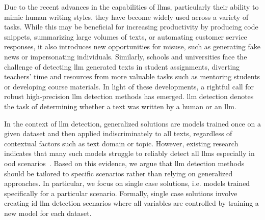 Due to the recent advances in the capabilities of \acp{llm}, particularly their ability to mimic human writing styles, they have become widely used across a variety of tasks.
While this may be beneficial for increasing productivity by producing code snippets, summarizing large volumes of texts, or automating customer service responses, it also introduces new opportunities for misuse, such as generating fake news or impersonating individuals.
Similarly, schools and universities face the challenge of detecting \ac{llm} generated texts in student assignments, diverting teachers' time and resources from more valuable tasks such as mentoring students or developing course materials.
In light of these developments, a rightful call for robust high-precision \ac{llm} detection methods has emerged.
\ac{llm} detection denotes the task of determining whether a text was written by a human or an \ac{llm}.

In the context of \ac{llm} detection, generalized solutions are models trained once on a given dataset and then applied indiscriminately to all texts, regardless of contextual factors such as text domain or topic. 
However, existing research indicates that many such models struggle to reliably detect all \acp{llm} especially in \ac{ood} scenarios~\citep{bhattacharjee_fighting_2024,li_learning_2025}.
Based on this evidence, we argue that \ac{llm} detection methods should be tailored to specific scenarios rather than relying on generalized approaches.
In particular, we focus on single case solutions, i.e. models trained specifically for a particular scenario.
Formally, single case solutions involve creating \ac{id} \ac{llm} detection scenarios where all variables are controlled by training a new model for each dataset.

